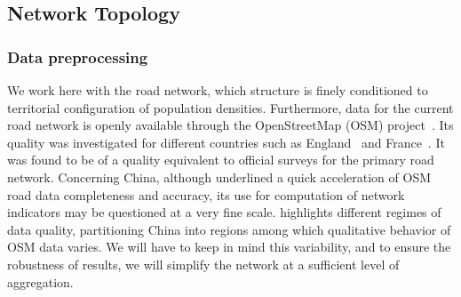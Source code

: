 

\subsection{Network Topology}

\subsubsection{Data preprocessing}

We work here with the road network, which structure is finely conditioned to territorial configuration of population densities. Furthermore, data for the current road network is openly available through the OpenStreetMap (OSM) project~\cite{openstreetmap}. Its quality was investigated for different countries such as England~\cite{haklay2010good} and France~\cite{girres2010quality}. It was found to be of a quality equivalent to official surveys for the primary road network. Concerning China, although \cite{zheng2014assessing} underlined a quick acceleration of OSM road data completeness and accuracy, its use for computation of network indicators may be questioned at a very fine scale. \cite{zhang2015density} highlights different regimes of data quality, partitioning China into regions among which qualitative behavior of OSM data varies. We will have to keep in mind this variability, and to ensure the robustness of results, we will simplify the network at a sufficient level of aggregation.



